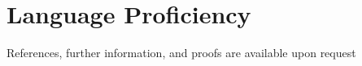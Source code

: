\documentclass[11pt,a4paper,sans]{moderncv}
\begin{document}
\section{Language Proficiency}

\vspace*{1em}

\begin{center}
References, further information, and proofs are available upon request
\end{center}
\end{document}
